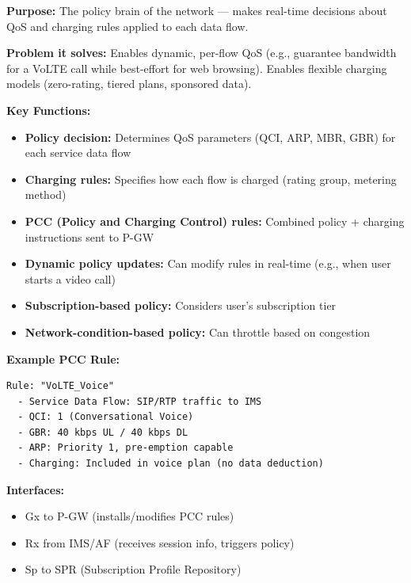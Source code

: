 
\textbf{Purpose:} The policy brain of the network — makes real-time decisions about QoS and charging rules applied to each data flow.

\textbf{Problem it solves:} Enables dynamic, per-flow QoS (e.g., guarantee bandwidth for a VoLTE call while best-effort for web browsing). Enables flexible charging models (zero-rating, tiered plans, sponsored data).

\textbf{Key Functions:}

\begin{itemize}
\tightlist
\item
  \textbf{Policy decision:} Determines QoS parameters (QCI, ARP, MBR, GBR) for each service data flow
\item
  \textbf{Charging rules:} Specifies how each flow is charged (rating group, metering method)
\item
  \textbf{PCC (Policy and Charging Control) rules:} Combined policy + charging instructions sent to P-GW
\item
  \textbf{Dynamic policy updates:} Can modify rules in real-time (e.g., when user starts a video call)
\item
  \textbf{Subscription-based policy:} Considers user’s subscription tier
\item
  \textbf{Network-condition-based policy:} Can throttle based on congestion
\end{itemize}

\textbf{Example PCC Rule:}

\def\CNcodelang{}

\begin{CNplaincode}
\begin{Verbatim}
Rule: "VoLTE_Voice"
  - Service Data Flow: SIP/RTP traffic to IMS
  - QCI: 1 (Conversational Voice)
  - GBR: 40 kbps UL / 40 kbps DL
  - ARP: Priority 1, pre-emption capable
  - Charging: Included in voice plan (no data deduction)
\end{Verbatim}
\end{CNplaincode}

\textbf{Interfaces:}

\begin{itemize}
\tightlist
\item
  Gx to P-GW (installs/\allowbreak{}modifies PCC rules)
\item
  Rx from IMS/\allowbreak{}AF (receives session info, triggers policy)
\item
  Sp to SPR (Subscription Profile Repository)
\end{itemize}


